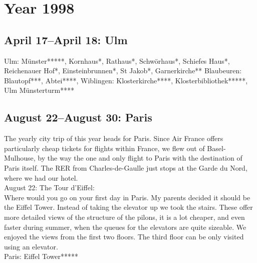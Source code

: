 \chapter{Year 1998}
\label{1998}

\section{April 17--April 18: Ulm}
\label{1998:Ulm}


Ulm: M\"unster*****, Kornhaus*, Rathaus*, Schw\"orhaus*, Schiefes Haus*, Reichenauer Hof*, Einsteinbrunnen*, St Jakob*, Garnerkirche**
Blaubeuren: Blautopf***, Abtei****, Wiblingen: Klosterkirche****, Klosterbibliothek*****, Ulm M\"unsterturm****

\section{August 22--August 30: Paris}
\label{1998:Paris}

The yearly city trip of this year heads for Paris. Since Air France offers particularly cheap tickets for flights within France, we flew out of Basel-Mulhouse, by the way the one and only flight to Paris with the destination of Paris itself. The RER from Charles-de-Gaulle just stops at the Garde du Nord, where we had our hotel.\\

August 22: The Tour d'Eiffel:\\
Where would you go on your first day in Paris. My parents decided it should be the Eiffel Tower. Instead of taking the elevator up we took the stairs. These offer more detailed views of the structure of the pilons, it is a lot cheaper, and even faster during summer, when the queues for the elevators are quite sizeable. We enjoyed the views from the first two floors. The third floor can be only visited using an elevator.\\

Paris: Eiffel Tower*****\\

